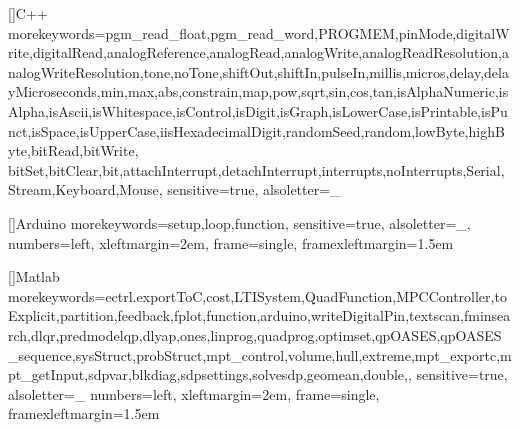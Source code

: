 %
%


\makeatletter
{}
\makeatother

 \usepackage{graphicx}
\graphicspath{{./figs/}}
\usepackage{epstopdf} %
\newcommand{\figone}[0] {1.000\textwidth} %
\newcommand{\figtwo}[0] {0.48\textwidth} %
\newcommand{\figthree}[0] {0.321\textwidth} %
\newcommand{\figtwoh}[0] {0.3\textheight} %


\usepackage{subfigure}
\usepackage{amsfonts}
\usepackage{amssymb}
\usepackage{amsmath}
\usepackage{theorem}
\usepackage{epsfig}
\usepackage{mathrsfs} %
\usepackage[cp1250]{inputenc}
\usepackage[T1]{fontenc}
\usepackage{courier} %
\usepackage{listings}
\lstset{basicstyle=\normalsize\ttfamily,breaklines=true,numbers=left,xleftmargin=2em,frame=single,framexleftmargin=1.5em}

[]{C++}      %
{morekeywords={pgm_read_float,pgm_read_word,PROGMEM,pinMode,digitalWrite,digitalRead,analogReference,analogRead,analogWrite,analogReadResolution,analogWriteResolution,tone,noTone,shiftOut,shiftIn,pulseIn,millis,micros,delay,delayMicroseconds,min,max,abs,constrain,map,pow,sqrt,sin,cos,tan,isAlphaNumeric,isAlpha,isAscii,isWhitespace,isControl,isDigit,isGraph,isLowerCase,isPrintable,isPunct,isSpace,isUpperCase,iisHexadecimalDigit,randomSeed,random,lowByte,highByte,bitRead,bitWrite,
bitSet,bitClear,bit,attachInterrupt,detachInterrupt,interrupts,noInterrupts,Serial,Stream,Keyboard,Mouse},
sensitive=true,
alsoletter={_}
}



[]{Arduino}      %
{morekeywords={setup,loop,function},
sensitive=true,
alsoletter={_},
numbers=left,
xleftmargin=2em,
frame=single,
framexleftmargin=1.5em
}

[]{Matlab}      {morekeywords={ectrl.exportToC,cost,LTISystem,QuadFunction,MPCController,toExplicit,partition,feedback,fplot,function,arduino,writeDigitalPin,textscan,fminsearch,dlqr,predmodelqp,dlyap,ones,linprog,quadprog,optimset,qpOASES,qpOASES_sequence,sysStruct,probStruct,mpt_control,volume,hull,extreme,mpt_exportc,mpt_getInput,sdpvar,blkdiag,sdpsettings,solvesdp,geomean,double,},
sensitive=true,
alsoletter={_}
numbers=left,
xleftmargin=2em,
frame=single,
framexleftmargin=1.5em
}

